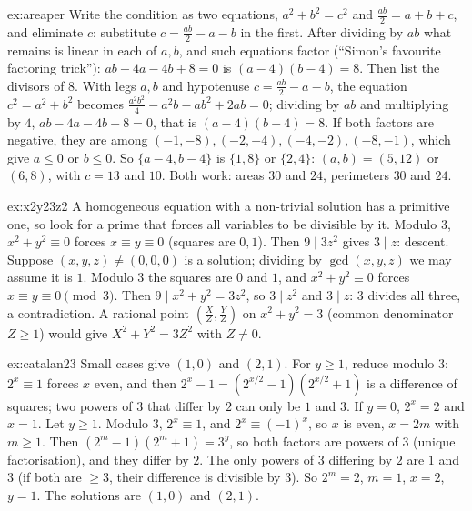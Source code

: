 \begin{solution}{ex:areaper}
\idea Write the condition as two equations, $a^2+b^2=c^2$ and $\frac{ab}2=a+b+c$, and eliminate $c$: substitute $c=\frac{ab}2-a-b$ in the first. After dividing by $ab$ what remains is linear in each of $a,b$, and such equations factor (``Simon's favourite factoring trick''): $ab-4a-4b+8=0$ is $(a-4)(b-4)=8$. Then list the divisors of $8$.
\writeup With legs $a,b$ and hypotenuse $c=\frac{ab}2-a-b$, the equation $c^2=a^2+b^2$ becomes $\frac{a^2b^2}4-a^2b-ab^2+2ab=0$; dividing by $ab$ and multiplying by $4$, $ab-4a-4b+8=0$, that is $(a-4)(b-4)=8$. If both factors are negative, they are among $(-1,-8),(-2,-4),(-4,-2),(-8,-1)$, which give $a\le0$ or $b\le0$. So $\{a-4,b-4\}$ is $\{1,8\}$ or $\{2,4\}$: $(a,b)=(5,12)$ or $(6,8)$, with $c=13$ and $10$. Both work: areas $30$ and $24$, perimeters $30$ and $24$.
\end{solution}

\begin{solution}{ex:x2y23z2}
\idea A homogeneous equation with a non-trivial solution has a primitive one, so look for a prime that forces all variables to be divisible by it. Modulo $3$, $x^2+y^2\equiv0$ forces $x\equiv y\equiv0$ (squares are $0,1$). Then $9\mid3z^2$ gives $3\mid z$: descent.
\writeup Suppose $(x,y,z)\ne(0,0,0)$ is a solution; dividing by $\gcd(x,y,z)$ we may assume it is $1$. Modulo $3$ the squares are $0$ and $1$, and $x^2+y^2\equiv0$ forces $x\equiv y\equiv0\pmod3$. Then $9\mid x^2+y^2=3z^2$, so $3\mid z^2$ and $3\mid z$: $3$ divides all three, a contradiction. A rational point $(\frac XZ,\frac YZ)$ on $x^2+y^2=3$ (common denominator $Z\ge1$) would give $X^2+Y^2=3Z^2$ with $Z\ne0$.
\end{solution}

\begin{solution}{ex:catalan23}
\idea Small cases give $(1,0)$ and $(2,1)$. For $y\ge1$, reduce modulo $3$: $2^x\equiv1$ forces $x$ even, and then $2^x-1=(2^{x/2}-1)(2^{x/2}+1)$ is a difference of squares; two powers of $3$ that differ by $2$ can only be $1$ and $3$.
\writeup If $y=0$, $2^x=2$ and $x=1$. Let $y\ge1$. Modulo $3$, $2^x\equiv1$, and $2^x\equiv(-1)^x$, so $x$ is even, $x=2m$ with $m\ge1$. Then $(2^m-1)(2^m+1)=3^y$, so both factors are powers of $3$ (unique factorisation), and they differ by $2$. The only powers of $3$ differing by $2$ are $1$ and $3$ (if both are $\ge3$, their difference is divisible by $3$). So $2^m=2$, $m=1$, $x=2$, $y=1$. The solutions are $(1,0)$ and $(2,1)$.
\end{solution}

